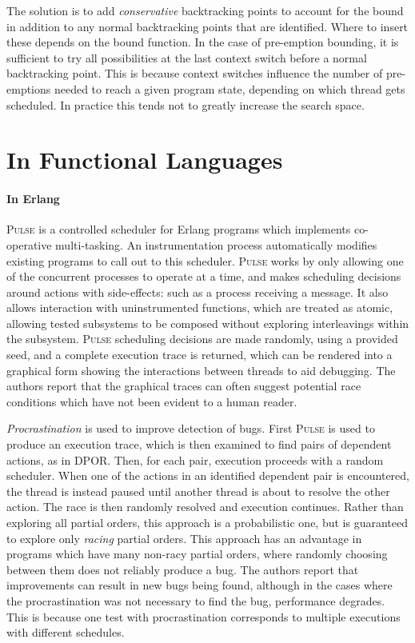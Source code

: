 The solution is to add \emph{conservative} backtracking points to
account for the bound in addition to any normal backtracking points
that are identified.  Where to insert these depends on the bound
function.  In the case of pre-emption bounding, it is sufficient to
try all possibilities at the last context switch before a normal
backtracking point\cite{coons2013}.  This is because context switches
influence the number of pre-emptions needed to reach a given program
state, depending on which thread gets scheduled.  In practice this
tends not to greatly increase the search space.

\section{In Functional Languages}
\label{sec:sct-functional}

\paragraph{In Erlang}
\textsc{Pulse}\cite{claessen2009} is a controlled scheduler for Erlang
programs which implements co-operative multi-tasking.  An
instrumentation process automatically modifies existing programs to
call out to this scheduler.  \textsc{Pulse} works by only allowing one
of the concurrent processes to operate at a time, and makes scheduling
decisions around actions with side-effects: such as a process
receiving a message.  It also allows interaction with uninstrumented
functions, which are treated as atomic, allowing tested subsystems to
be composed without exploring interleavings within the subsystem.
\textsc{Pulse} scheduling decisions are made randomly, using a
provided seed, and a complete execution trace is returned, which can
be rendered into a graphical form showing the interactions between
threads to aid debugging.  The authors report that the graphical
traces can often suggest potential race conditions which have not been
evident to a human reader.

\emph{Procrastination}\cite{sen2008} is used to improve detection of
bugs.  First \textsc{Pulse} is used to produce an execution trace,
which is then examined to find pairs of dependent actions, as in DPOR.
Then, for each pair, execution proceeds with a random scheduler.  When
one of the actions in an identified dependent pair is encountered, the
thread is instead paused until another thread is about to resolve the
other action.  The race is then randomly resolved and execution
continues.  Rather than exploring all partial orders, this approach is
a probabilistic one, but is guaranteed to explore only \emph{racing}
partial orders.  This approach has an advantage in programs which have
many non-racy partial orders, where randomly choosing between them
does not reliably produce a bug.  The authors report that improvements
can result in new bugs being found, although in the cases where the
procrastination was not necessary to find the bug, performance
degrades\cite{arts2011}.  This is because one test with
procrastination corresponds to multiple executions with different
schedules.

